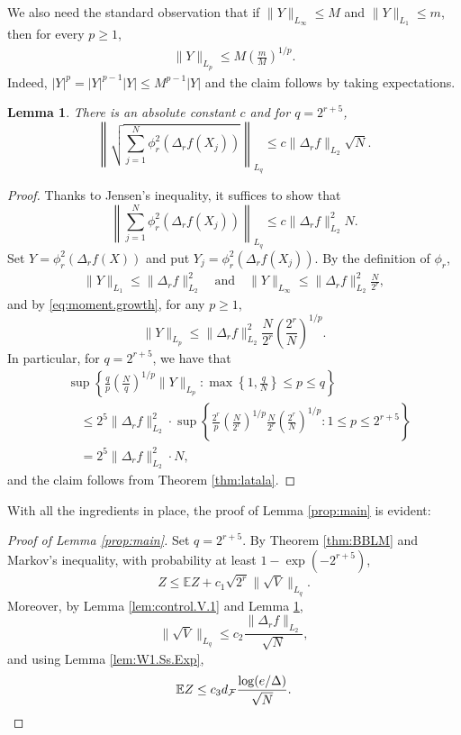 \documentclass[11pt]{amsart}
\newtheorem{lemma}[theorem]{Lemma}
\theoremstyle{definition}
\newcommand{\E}{\mathbb{E}}
\numberwithin{equation}{section}
\begin{document}
We also need the standard observation that if $\|Y\|_{L_{\infty}}\leq M$ and $\|Y\|_{L_{1}} \leq m$, then for every $p\geq 1$, 
\begin{align}
\label{eq:moment.growth}
\|Y\|_{L_{p}} \leq M \left(\frac{m}{M}\right)^{1/p}.
\end{align}
Indeed,  $|Y|^p = |Y|^{p-1} |Y| \le M^{p-1} |Y|$ and  the claim follows by taking expectations.

\begin{lemma}
\label{lem:control.V.2}
	There is an absolute constant $c$ and for  $q=2^{r+5}$,
\[ \left\|  \sqrt{  \sum_{j=1}^{N}  \phi_{r}^{2}(\Delta_{r}f(X_{j}))  }\right\|_{L_{q}} 
\leq c  \|\Delta_{r}f \|_{L_{2}}  \sqrt N .\] 
\end{lemma}
\begin{proof}
Thanks to Jensen's inequality, it suffices to show that
\[ %
\left\|   \sum_{j=1}^{N}  \phi_{r}^{2}(\Delta_{r}f(X_{j}))  \right\|_{L_{q}} 
\leq c \|\Delta_{r} f\|_{L_{2}}^{2} N. \]
Set $Y= \phi_{r}^{2}(\Delta_{r}f(X))$ and put $Y_{j} = \phi_{r}^{2}(\Delta_{r}f(X_{j}))$.
By the definition of $\phi_{r}$,
\begin{align*}
 \|  Y  \|_{L_1} 
\leq \|\Delta_{r} f\|_{L_{2}}^{2} \quad\text{and}\quad 
\|Y\|_{L_{\infty}}
 \leq  \|\Delta_{r} f\|_{L_{2}}^{2} \frac{N}{2^{r}},
\end{align*}
and by \eqref{eq:moment.growth},  for any $p\geq 1$,
\[ \|Y\|_{L_{p}} \leq  \| \Delta_{r} f \|_{L_2}^{2}  \frac{N}{2^{r}} \left( \frac{2^{r}}{N}  \right)^{1/p}.\]
In particular, for $q=2^{r+5}$, we have that
\begin{align*}
&\sup\left\{ \frac{q}{p} \left( \frac{ N}{q} \right)^{1/p}  \| Y  \|_{L_{p}} : \max\left\{1,\frac{q}{N}\right\} \leq p \leq q \right\} \\
& \quad\leq 2^{5} \| \Delta_{r}f\|_{L_2}^{2}     \cdot \sup\left\{ \frac{2^{r}}{p} \left( \frac{ N}{2^{r}} \right)^{1/p}  \frac{N}{2^{r}} \left( \frac{2^{r}}{N}  \right)^{1/p} : 1 \leq p \leq 2^{r+5} \right\} \\
&\quad = 2^{5} \| \Delta_{r}f\|_{L_2}^{2}  \cdot N,
\end{align*}
and the claim follows from Theorem \ref{thm:latala}.
\end{proof}

With all the ingredients in place, the proof of  Lemma \ref{prop:main} is evident:

\begin{proof}[Proof of Lemma \ref{prop:main}]
	Set $q=2^{r+5}$.
	By Theorem \ref{thm:BBLM} and Markov's inequality, with probability at least $1-\exp(-2^{r+5})$,
	\[ Z \leq \E Z + c_{1} \sqrt{2^{r}} \|\sqrt V\|_{L_{q}}.\]
	Moreover, by Lemma \ref{lem:control.V.1} and Lemma \ref{lem:control.V.2}, 
	\[ \|\sqrt V\|_{L_{q}} \leq c_{2} \frac{ \|\Delta_{r} f\|_{L_{2}}}{\sqrt N },\] 
	and using Lemma \ref{lem:W1.Ss.Exp}, 
	\[\E Z \leq c_{3} d_{\mathcal{F}}  \frac{ \log(e/\Delta) }{ \sqrt N }.\qedhere\]
\end{proof}
\end{document}
